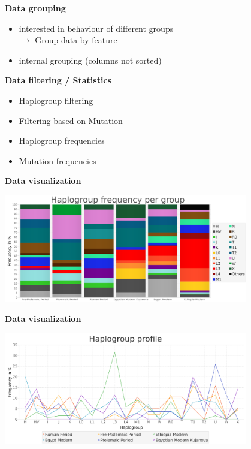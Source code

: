 \documentclass[a0paper,portrait, fontscale=0.285]{baposter}
\begin{document}
\begin{poster}
{\begin{minipage}[t]{0.5\textwidth}
\textbf{	Data grouping}
	\begin{itemize}
		\item interested in behaviour of different groups\\
		$\rightarrow$ Group data by feature 
		\item internal grouping (columns not sorted)
	\end{itemize}
\end{minipage}
\hspace{0.5em}
\begin{minipage}[t]{0.5\textwidth}
\textbf{Data filtering / Statistics}
	\begin{itemize}
		\item Haplogroup filtering
		\item Filtering based on Mutation
		\item Haplogroup frequencies
		\item Mutation frequencies
	\end{itemize}
\end{minipage}

\vspace{1em}

\begin{minipage}[t]{0.5\textwidth}
\textbf{Data visualization}
\begin{center}
		\includegraphics[width=0.8\textwidth]{figures/stackedBarchart.png}
\end{center}
\end{minipage}
\hspace{0.5em}
\begin{minipage}[t]{0.5\textwidth}
\textbf{Data visualization}
	\begin{center}
		\includegraphics[width=0.8\textwidth]{figures/profile.png}
	\end{center}
\end{minipage}

}




\end{poster}
\end{document}
